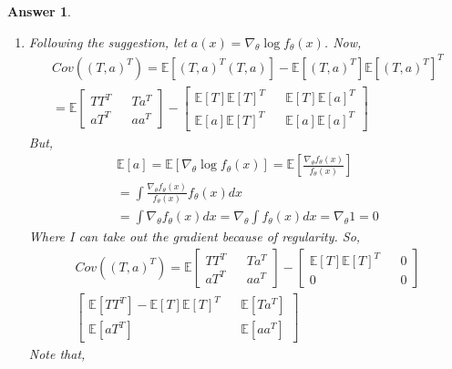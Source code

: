 \documentclass[12pt]{article}
\theoremstyle{colon}
\newtheorem*{answer}{Answer}
\begin{document}
\begin{answer}
  \begin{enumerate}[label=\arabic*)]
    \item Following the suggestion, let $a(x) = \nabla_\theta \log f_\theta(x)$. Now,
      \begin{gather*}
        Cov((T,a)^T) = \mathbb{E}[(T,a)^T (T,a)] - \mathbb{E}[(T,a)^T] \mathbb{E}[(T,a)^T]^T \\
        = \mathbb{E} \begin{bmatrix}
          T T^T && T a^T \\
          a T^T && a a^T
        \end{bmatrix} - \begin{bmatrix}
          \mathbb{E}[T]\mathbb{E}[T]^T && \mathbb{E}[T] \mathbb{E}[a]^T \\
          \mathbb{E}[a] \mathbb{E}[T]^T && \mathbb{E}[a] \mathbb{E}[a]^T
        \end{bmatrix}
      \end{gather*}
      But,
      \begin{gather*}
        \mathbb{E}[a] = \mathbb{E}[\nabla_\theta \log f_\theta(x)] = \mathbb{E}[\frac{\nabla_\theta f_\theta(x)}{f_\theta(x)}] \\
        = \int \frac{\nabla_\theta f_\theta(x)}{f_\theta(x)}f_\theta(x) dx \\
        = \int \nabla_\theta f_\theta(x) dx = \nabla_\theta \int f_\theta(x) dx = \nabla_\theta 1 = 0
      \end{gather*}
      Where I can take out the gradient because of regularity. So,
      \begin{gather*}
        Cov((T,a)^T) = \mathbb{E} \begin{bmatrix}
          T T^T && T a^T \\
          a T^T && a a^T
        \end{bmatrix} - \begin{bmatrix}
          \mathbb{E}[T]\mathbb{E}[T]^T && 0 \\
          0 && 0
        \end{bmatrix} \\
        \begin{bmatrix}
          \mathbb{E}[T T^T] - \mathbb{E}[T]\mathbb{E}[T]^T && \mathbb{E}[T a^T] \\
          \mathbb{E}[a T^T] && \mathbb{E}[a a^T]
        \end{bmatrix}
      \end{gather*}
      Note that,
      \begin{gather*}

\end{gather*}
\end{enumerate}
\end{answer}
\end{document}
